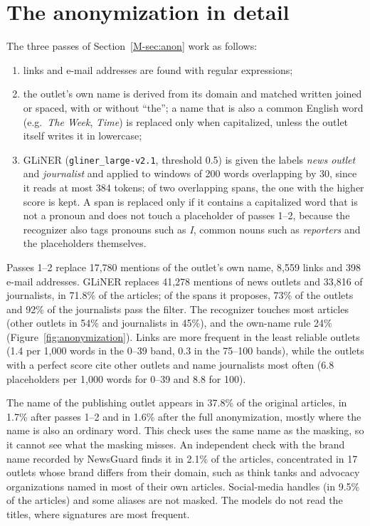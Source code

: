 \documentclass[11pt,a4paper]{article}
\begin{document}
\section{The anonymization in detail}\label{app:anonfig}
The three passes of Section~\ref{M-sec:anon} work as follows:
\begin{enumerate}
  \item links and e-mail addresses are found with regular expressions;
  \item the outlet's own name is derived from its domain and matched written joined or spaced, with or without ``the''; a
        name that is also a common English word (e.g.\ \emph{The Week}, \emph{Time}) is replaced only when capitalized,
        unless the outlet itself writes it in lowercase;
  \item GLiNER (\texttt{gliner\_large-v2.1}, threshold 0.5) is given the labels \emph{news outlet} and \emph{journalist}
        and applied to windows of 200 words overlapping by 30, since it reads at most 384 tokens; of two overlapping
        spans, the one with the higher score is kept. A span is replaced only if it contains a capitalized word that is
        not a pronoun and does not touch a placeholder of passes 1--2, because the recognizer also tags pronouns such as
        \emph{I}, common nouns such as \emph{reporters} and the placeholders themselves.
\end{enumerate}
Passes 1--2 replace 17,780 mentions of the outlet's own name, 8,559 links and 398 e-mail addresses. GLiNER replaces
41,278 mentions of news outlets and 33,816 of journalists, in 71.8\% of the articles; of the spans it proposes, 73\% of
the outlets and 92\% of the journalists pass the filter. The recognizer touches most articles (other outlets in 54\% and
journalists in 45\%), and the own-name rule 24\% (Figure~\ref{fig:anonymization}). Links are more frequent in the least
reliable outlets (1.4 per 1,000 words in the 0--39 band, 0.3 in the 75--100 bands), while the outlets with a perfect
score cite other outlets and name journalists most often (6.8 placeholders per 1,000 words for 0--39 and 8.8 for 100).

The name of the publishing outlet appears in 37.8\% of the original articles, in 1.7\% after passes 1--2 and in 1.6\%
after the full anonymization, mostly where the name is also an ordinary word. This check uses the same name as the
masking, so it cannot see what the masking misses. An independent check with the brand name recorded by NewsGuard finds
it in 2.1\% of the articles, concentrated in 17 outlets whose brand differs from their domain, such as think tanks and
advocacy organizations named in most of their own articles. Social-media handles (in 9.5\% of the articles) and some
aliases are not masked. The models do not read the titles, where signatures are most frequent.
\end{document}
